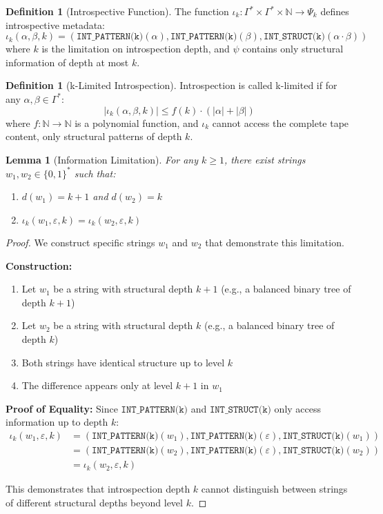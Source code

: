 \documentclass[11pt]{article}
\newtheorem{lemma}[theorem]{Lemma}
\theoremstyle{definition}
\newtheorem{definition}[theorem]{Definition}
\begin{document}
\begin{definition}[Introspective Function]
The function $\iota_k: \Gamma^* \times \Gamma^* \times \mathbb{N} \to \Psi_k$ defines introspective metadata:
$$\iota_k(\alpha, \beta, k) = (\texttt{INT\_PATTERN(k)}(\alpha), \texttt{INT\_PATTERN(k)}(\beta), \texttt{INT\_STRUCT(k)}(\alpha \cdot \beta))$$
where $k$ is the limitation on introspection depth, and $\psi$ contains only structural information of depth at most $k$.
\end{definition}

\begin{definition}[k-Limited Introspection]
Introspection is called k-limited if for any $\alpha, \beta \in \Gamma^*$:
$$|\iota_k(\alpha, \beta, k)| \leq f(k) \cdot (|\alpha| + |\beta|)$$
where $f: \mathbb{N} \to \mathbb{N}$ is a polynomial function, and $\iota_k$ cannot access the complete tape content, only structural patterns of depth $k$.
\end{definition}

\begin{lemma}[Information Limitation]
For any $k \geq 1$, there exist strings $w_1, w_2 \in \{0,1\}^*$ such that:
\begin{enumerate}
\item $d(w_1) = k+1$ and $d(w_2) = k$
\item $\iota_k(w_1, \varepsilon, k) = \iota_k(w_2, \varepsilon, k)$
\end{enumerate}
\end{lemma}

\begin{proof}
We construct specific strings $w_1$ and $w_2$ that demonstrate this limitation.

\textbf{Construction:}
\begin{enumerate}
\item Let $w_1$ be a string with structural depth $k+1$ (e.g., a balanced binary tree of depth $k+1$)
\item Let $w_2$ be a string with structural depth $k$ (e.g., a balanced binary tree of depth $k$)
\item Both strings have identical structure up to level $k$
\item The difference appears only at level $k+1$ in $w_1$
\end{enumerate}

\textbf{Proof of Equality:}
Since $\texttt{INT\_PATTERN(k)}$ and $\texttt{INT\_STRUCT(k)}$ only access information up to depth $k$:
\begin{align*}
\iota_k(w_1, \varepsilon, k) &= (\texttt{INT\_PATTERN(k)}(w_1), \texttt{INT\_PATTERN(k)}(\varepsilon), \texttt{INT\_STRUCT(k)}(w_1)) \\
&= (\texttt{INT\_PATTERN(k)}(w_2), \texttt{INT\_PATTERN(k)}(\varepsilon), \texttt{INT\_STRUCT(k)}(w_2)) \\
&= \iota_k(w_2, \varepsilon, k)
\end{align*}

This demonstrates that introspection depth $k$ cannot distinguish between strings of different structural depths beyond level $k$.
\end{proof}
\end{document}
